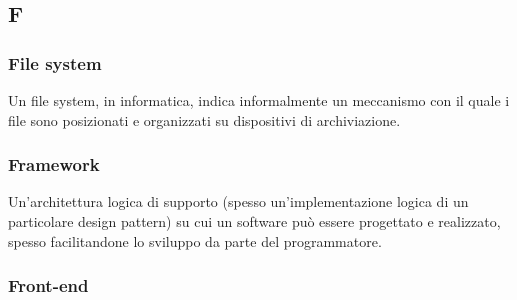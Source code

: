 \subsection*{\textbf{\hfill \Huge{F} \hfill}} 
\subsubsection*{File system}
Un file system, in informatica, indica informalmente un meccanismo con il quale i file sono posizionati e organizzati su dispositivi di archiviazione.
\subsubsection*{Framework}
Un’architettura logica di supporto (spesso un’implementazione logica di un particolare design pattern) su cui un software può essere progettato e realizzato, spesso facilitandone lo sviluppo da parte del programmatore.
\subsubsection*{Front-end}

